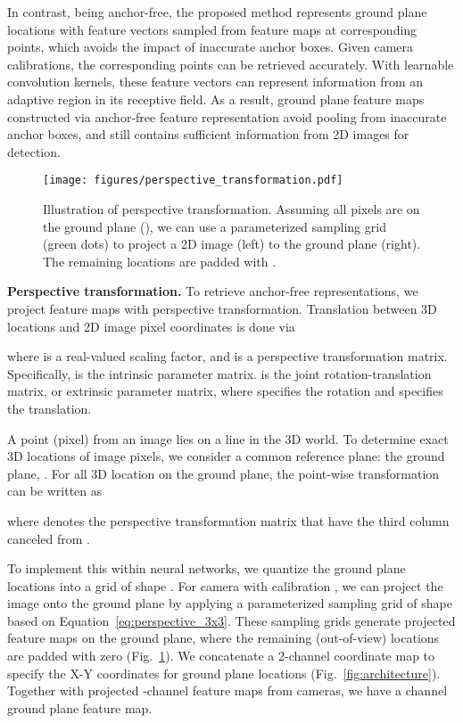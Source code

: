 \documentclass[runningheads]{llncs}
\begin{document}
In contrast, being anchor-free, the proposed method represents ground plane locations with feature vectors sampled from feature maps at corresponding points, which avoids the impact of inaccurate anchor boxes. Given camera calibrations, the corresponding points can be retrieved accurately. 
With learnable convolution kernels, these feature vectors can represent information from an adaptive region in its receptive field. 
As a result, ground plane feature maps constructed via anchor-free feature representation avoid pooling from inaccurate anchor boxes, and still contains sufficient information from 2D images for detection.



\begin{figure}[t]
    \centering
    \texttt{[image: figures/perspective\_transformation.pdf]}
    \caption{Illustration of perspective transformation. Assuming all pixels are on the ground plane (), we can use a parameterized sampling grid (green dots) to project a 2D image (left) to the ground plane (right). The remaining locations are padded with .
}
    \label{fig:perspective_trans}
\end{figure}



\textbf{Perspective transformation.} 
To retrieve anchor-free representations, we project feature maps with perspective transformation. Translation between 3D locations  and 2D image pixel coordinates  is done via

where  is a real-valued scaling factor, and  is a  perspective transformation matrix. Specifically,  is the  intrinsic parameter matrix. 
 is the  joint rotation-translation matrix, or extrinsic parameter matrix, where  specifies the rotation and  specifies the translation. 

A point (pixel) from an image lies on a line in the 3D world. To determine exact 3D locations of image pixels, we consider a common reference plane: the ground plane, . For all 3D location  on the ground plane, the point-wise transformation can be written as

where  denotes the  perspective transformation matrix that have the third column canceled from . 

To implement this within neural networks, we quantize the ground plane locations into a grid of shape . For camera  with calibration , we can project the image onto the  ground plane by applying a parameterized sampling grid of shape  based on Equation~\ref{eq:perspective_3x3}. These sampling grids generate projected feature maps on the ground plane, where the remaining (out-of-view) locations are padded with zero (Fig.~\ref{fig:perspective_trans}). 
We concatenate a 2-channel coordinate map \cite{liu2018intriguing} to specify the X-Y coordinates for ground plane locations (Fig.~\ref{fig:architecture}). Together with projected -channel feature maps from  cameras, we have a  channel ground plane feature map. 
\end{document}
